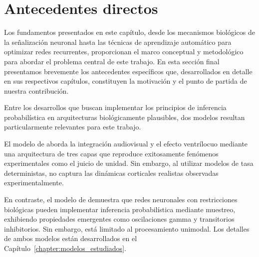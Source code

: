 


\section{Antecedentes directos}
\label{subsec:antecedentes_directos}

Los fundamentos presentados en este capítulo, desde los mecanismos biológicos de la señalización neuronal hasta las técnicas de aprendizaje automático para optimizar redes recurrentes, proporcionan el marco conceptual y metodológico para abordar el problema central de este trabajo. En esta sección final presentamos brevemente los antecedentes específicos que, desarrollados en detalle en sus respectivos capítulos, constituyen la motivación y el punto de partida de nuestra contribución.

Entre los desarrollos que buscan implementar los principios de inferencia probabilística en arquitecturas biológicamente plausibles, dos modelos resultan particularmente relevantes para este trabajo.

El modelo de \citet{cuppini2017biologically} aborda la integración audiovisual y el efecto ventrílocuo mediante una arquitectura de tres capas que reproduce exitosamente fenómenos experimentales como el juicio de unidad. Sin embargo, al utilizar modelos de tasa deterministas, no captura las dinámicas corticales realistas observadas experimentalmente. 

En contraste, el modelo de \citet{echeveste2020cortical} demuestra que redes neuronales con restricciones biológicas pueden implementar inferencia probabilística mediante muestreo, exhibiendo propiedades emergentes como oscilaciones gamma y transitorios inhibitorios. Sin embargo, está limitado al procesamiento unimodal. Los detalles de ambos modelos están desarrollados en el Capítulo~\ref{chapter:modelos_estudiados}.

